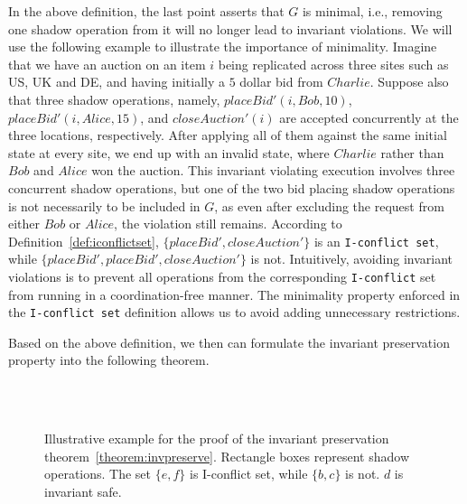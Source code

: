 In the above definition, the last point asserts that
$G$ is minimal, i.e., removing one shadow operation from it will no
longer lead to invariant violations. We will use the following example to illustrate
the importance of minimality. Imagine that we have an auction on an item $i$ 
being replicated across three sites such as US, UK and DE,
and having initially a $5$ dollar bid from $Charlie$. Suppose also that three shadow operations,
namely, $placeBid'(i, Bob, 10)$, $placeBid'(i, Alice, 15)$, and 
$closeAuction'(i)$ are accepted concurrently at the three locations, respectively. 
After applying all of them against the same initial state at every site,
we end up with an invalid state, where $Charlie$ rather than $Bob$ and $Alice$ won
the auction. This invariant violating execution
involves three concurrent shadow operations, but one of the two bid placing shadow
operations is not necessarily to be included in $G$, as even after excluding
the request from either $Bob$ or $Alice$, the violation still remains. According
to Definition~\ref{def:iconflictset}, $\{ placeBid', closeAuction'\}$ is an \texttt{I-conflict set},
while $\{placeBid', placeBid', closeAuction'\}$ is not. Intuitively, avoiding invariant
violations is to prevent all operations from the corresponding \texttt{I-conflict} set
from running in a coordination-free manner. The minimality property enforced in the \texttt{I-conflict set}
definition allows us to avoid adding unnecessary restrictions.  

Based on the above definition, we then can
 formulate the invariant preservation property into the following theorem.

\begin{figure}[t!]
\begin{minipage}[t]{0.5\textwidth}
\end{minipage}
\begin{minipage}[t]{0.5\textwidth}
\centering
{}\\
\\
\end{minipage}
\caption{Illustrative example for the proof of the invariant preservation theorem~\ref{theorem:invpreserve}. Rectangle boxes represent
shadow operations. The set $\{e, f\}$ is I-conflict set, while $\{b, c\}$ is not. $d$ is invariant safe.}
\label{fig:invarexample}
\end{figure}
\fi

